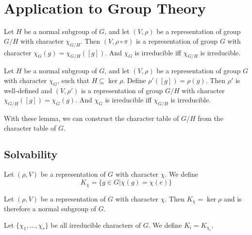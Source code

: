 \documentclass[12pt]{book}
\begin{document}
	\section{Application to Group Theory}
	
	\begin{lemma}
		Let $H$ be a normal subgroup of $G$, and let $(V,\rho)$ be a representation of group $G/H$ with character $\chi_{G/H}$. Then $(V,\rho\circ\pi)$ is a representation of group $G$ with character $\chi_G(g)=\chi_{G/H}([g])$. And $\chi_G$ is irreducible iff $\chi_{G/H}$ is irreducible.
	\end{lemma}
	
	\begin{lemma}
		Let $H$ be a normal subgroup of $G$, and let $(V,\rho)$ be a representation of group $G$ with character $\chi_{G}$, such that $H\subseteq \ker\rho$. Define $\rho'([g])=\rho(g)$. Then $\rho'$ is well-defined and $(V,\rho')$ is a representation of group $G/H$ with character $\chi_{G/H}([g])=\chi_{G}(g)$. And $\chi_G$ is irreducible iff $\chi_{G/H}$ is irreducible.
	\end{lemma}
	
	With these lemma, we can construct the character table of $G/H$ from the character table of $G$.
	
	\subsection{Solvability}
	\begin{definition}
		Let $(\rho,V)$ be a representation of $G$ with character $\chi$. We define
		\begin{equation}
			K_\chi=\{g\in G|\chi(g)=\chi(e)\}
		\end{equation}
	\end{definition}
	
	\begin{theorem}
		Let $(\rho,V)$ be a representation of $G$ with character $\chi$. Then $K_\chi=\ker \rho$ and is therefore a normal subgroup of $G$.
	\end{theorem}
	
	\begin{definition}
		Let $\{\chi_1,\dots,\chi_r\}$ be all irreducible characters of $G$. We define $K_i=K_{\chi_i}$.
	\end{definition}
	
\end{document}

